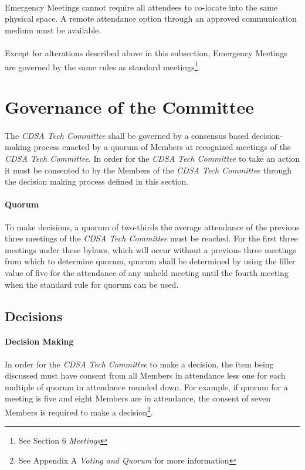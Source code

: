 \documentclass[12pt,letter,twocolumn,oneside,draft]{article}
\newcommand{\cname}{\emph{CDSA Tech Committee}}
\begin{document}
\paragraph{}
Emergency Meetings cannot require all attendees to co-locate into the same
physical space. A remote attendance option through an approved communication
medium must be available. 

\paragraph{}
Except for alterations described above in this subsection, Emergency Meetings
are governed by the same rules as standard meetings\footnote{See Section 6
\emph{Meetings}}.


\section{Governance of the Committee}

\paragraph{}
The \cname{} shall be governed by a consensus based decision-making process
enacted by a quorum of Members at recognized meetings of the \cname{}. In order
for the \cname{} to take an action it must be consented to by the Members of
the \cname{} through the decision making process defined in this section.

\paragraph{Quorum}
To make decisions, a quorum of two-thirds the average attendance of the
previous three meetings of the \cname{} must be reached. For the first three
meetings under these bylaws, which will occur without a previous three meetings
from which to determine quorum, quorum shall be determined by using the filler
value of five for the attendance of any unheld meeting until the fourth meeting
when the standard rule for quorum can be used.

\subsection{Decisions}

\paragraph{Decision Making}
In order for the \cname{} to make a decision, the item being discussed must
have consent from all Members in attendance less one for each multiple of
quorum in attendance rounded down. For example, if quorum for a meeting is five
and eight Members are in attendance, the consent of seven Members is required
to make a decision\footnote{See Appendix A \emph{Voting and Quorum} for more information}.
\end{document}
